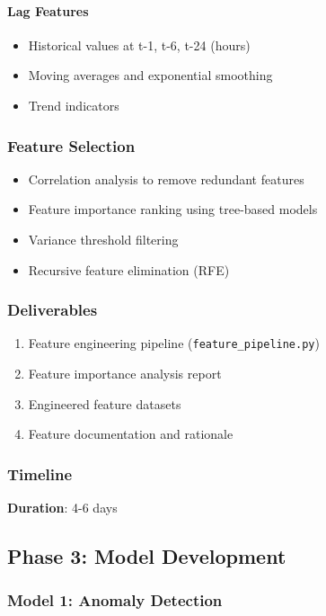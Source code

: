 \documentclass[12pt,a4paper]{article}
\begin{document}
\paragraph{Lag Features}
\begin{itemize}[leftmargin=*]
    \item Historical values at t-1, t-6, t-24 (hours)
    \item Moving averages and exponential smoothing
    \item Trend indicators
\end{itemize}

\subsubsection{Feature Selection}
\begin{itemize}[leftmargin=*]
    \item Correlation analysis to remove redundant features
    \item Feature importance ranking using tree-based models
    \item Variance threshold filtering
    \item Recursive feature elimination (RFE)
\end{itemize}

\subsubsection{Deliverables}
\begin{enumerate}
    \item Feature engineering pipeline (\texttt{feature\_pipeline.py})
    \item Feature importance analysis report
    \item Engineered feature datasets
    \item Feature documentation and rationale
\end{enumerate}

\subsubsection{Timeline}
\textbf{Duration}: 4-6 days

\newpage

\subsection{Phase 3: Model Development}

\subsubsection{Model 1: Anomaly Detection}
\end{document}
